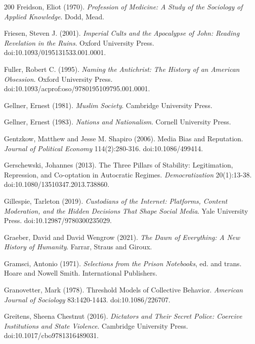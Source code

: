 \documentclass[11pt,letterpaper]{article}
\theoremstyle{definition}
\theoremstyle{remark}
\begin{document}
\begin{thebibliography}{200}
Freidson, Eliot (1970). \emph{Profession of Medicine: A Study of the Sociology of Applied Knowledge}. Dodd, Mead.

Friesen, Steven J. (2001). \emph{Imperial Cults and the Apocalypse of John: Reading Revelation in the Ruins}. Oxford University Press. doi:10.1093/0195131533.001.0001.

Fuller, Robert C. (1995). \emph{Naming the Antichrist: The History of an American Obsession}. Oxford University Press. doi:10.1093/acprof:oso/9780195109795.001.0001.

Gellner, Ernest (1981). \emph{Muslim Society}. Cambridge University Press.

Gellner, Ernest (1983). \emph{Nations and Nationalism}. Cornell University Press.

Gentzkow, Matthew and Jesse M. Shapiro (2006). Media Bias and Reputation. \emph{Journal of Political Economy} 114(2):280-316. doi:10.1086/499414.

Gerschewski, Johannes (2013). The Three Pillars of Stability: Legitimation, Repression, and Co-optation in Autocratic Regimes. \emph{Democratization} 20(1):13-38. doi:10.1080/13510347.2013.738860.

Gillespie, Tarleton (2019). \emph{Custodians of the Internet: Platforms, Content Moderation, and the Hidden Decisions That Shape Social Media}. Yale University Press. doi:10.12987/9780300235029.

Graeber, David and David Wengrow (2021). \emph{The Dawn of Everything: A New History of Humanity}. Farrar, Straus and Giroux.

Gramsci, Antonio (1971). \emph{Selections from the Prison Notebooks}, ed. and trans. Hoare and Nowell Smith. International Publishers.

Granovetter, Mark (1978). Threshold Models of Collective Behavior. \emph{American Journal of Sociology} 83:1420-1443. doi:10.1086/226707.

Greitens, Sheena Chestnut (2016). \emph{Dictators and Their Secret Police: Coercive Institutions and State Violence}. Cambridge University Press. doi:10.1017/cbo9781316489031.


\end{thebibliography}
\end{document}
